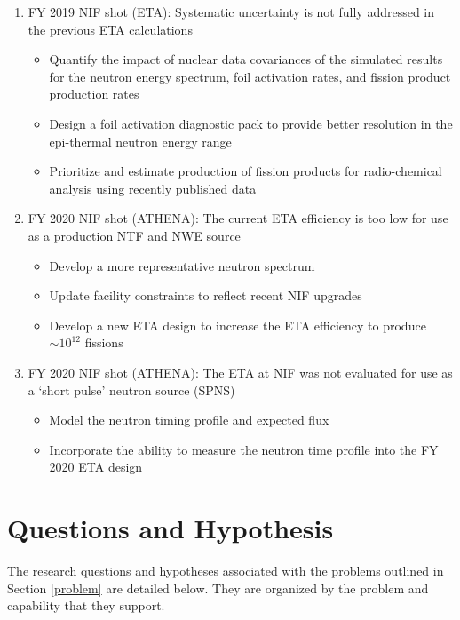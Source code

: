 \begin{enumerate}
	\item FY 2019 NIF shot (ETA): Systematic uncertainty is not fully addressed in the previous ETA calculations
	\begin{itemize}
		\item Quantify the impact of nuclear data covariances of the simulated results for the neutron energy spectrum, foil activation rates, and fission product production rates
		\item Design a foil activation diagnostic pack to provide better resolution in the epi-thermal neutron energy range
		\item Prioritize and estimate production of fission products for radio-chemical analysis using recently published data
	\end{itemize} 
	
	\item FY 2020 NIF shot (ATHENA): The current ETA efficiency is too low for use as a production NTF and NWE source %
		\begin{itemize}
			\item Develop a more representative neutron spectrum
			\item Update facility constraints to reflect recent NIF upgrades %
			\item Develop a new ETA design to increase the ETA efficiency to produce $\sim 10^{12}$ fissions
		\end{itemize}		 
	
	\item FY 2020 NIF shot (ATHENA): The ETA at NIF was not evaluated for use as a `short pulse' neutron source (SPNS)
		\begin{itemize}
			\item Model the neutron timing profile and expected flux
			\item Incorporate the ability to measure the neutron time profile into the FY 2020 ETA design
		\end{itemize}		

\end{enumerate} 


\section{Questions and Hypothesis}
The research questions and hypotheses associated with the problems outlined in Section \ref{problem} are detailed below.  
They are organized by the problem and capability that they support.

